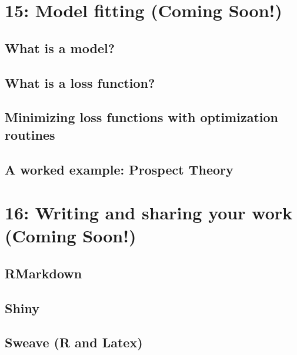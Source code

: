 \documentclass{tufte-book}\usepackage[]{graphicx}\usepackage[]{color}
\begin{document}
\begin{footnotesize}

\chapter{15: Model fitting (Coming Soon!)}
\label{ch:15}


\section{What is a model?}
\section{What is a loss function?}
\section{Minimizing loss functions with optimization routines}
\section{A worked example: Prospect Theory}



\chapter{16: Writing and sharing your work (Coming Soon!)}
\label{ch:16}

\section{RMarkdown}
\section{Shiny}
\section{Sweave (R and Latex)}




\end{footnotesize}
\end{document}
